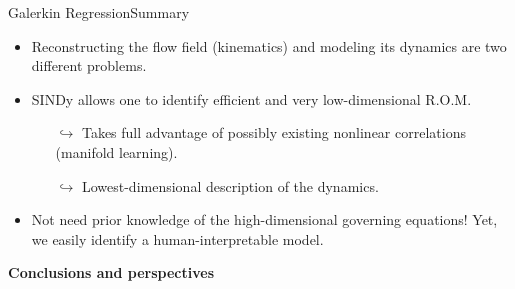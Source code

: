 \documentclass[usenames,dvipsnames,svgnames,10pt,aspectratio=169]{beamer}
\begin{document}
\begin{frame}[t, c]{Galerkin Regression}{Summary}
	\begin{itemize}
		\item Reconstructing the flow field (kinematics) and modeling its dynamics are two different problems.
		\bigskip
		\item SINDy allows one to identify efficient and very low-dimensional R.O.M.
		\begin{itemize}
			\item[$\hookrightarrow$] Takes full advantage of possibly existing nonlinear correlations (manifold learning).
			\item[$\hookrightarrow$] Lowest-dimensional description of the dynamics.
		\end{itemize}
		\bigskip
		\item Not need prior knowledge of the high-dimensional governing equations! Yet, we easily identify a human-interpretable model.
	\end{itemize}
	\vspace{1cm}
\end{frame}


\begin{frame}[t, c]
	\centering
	\vspace{1cm}
	{\Large \textbf{Conclusions and perspectives}}
\end{frame}
\end{document}
